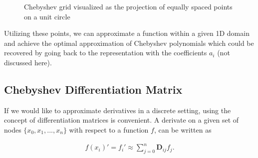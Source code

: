 \begin{figure}[ht]
  \centering


  \caption{Chebyshev grid visualized as the projection of equally spaced
    points on a unit circle}
  \label{fig:cheb_grid1d}
\end{figure}

Utilizing these points, we can approximate a function within a given 1D domain
and achieve the optimal approximation of Chebyshev polynomials which could be
recovered by going back to the representation with the coefficients $a_i$ (not
discussed here).

\subsection{Chebyshev Differentiation Matrix}

If we would like to approximate derivatives in a discrete setting, using the
concept of differentiation matrices is convenient. A derivate on a given set of
nodes $\{x_0, x_1,..., x_n\}$ with respect to a function $f$, can be written as

\begin{align}
f(x_i)' = f_i' \approx \sum_{j=0}^{n}\mathbf{D}_{ij}f_j.
\end{align}

